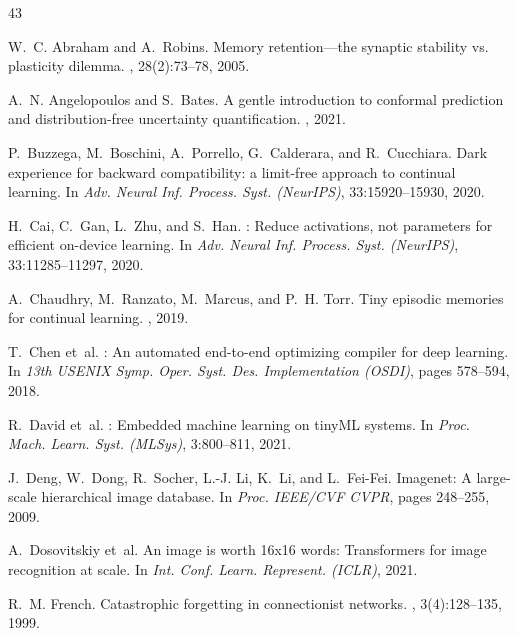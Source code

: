 \documentclass{article}
\begin{document}
\clearpage

\begin{thebibliography}{43}
\fontsize{7.2pt}{8.4pt}\selectfont
\setlength{\itemsep}{0.0pt plus 0.2pt}
\setlength{\parskip}{0pt}

W.~C. Abraham and A.~Robins.
\newblock Memory retention---the synaptic stability vs. plasticity dilemma.
, 28(2):73--78, 2005.

A.~N. Angelopoulos and S.~Bates.
\newblock A gentle introduction to conformal prediction and distribution-free uncertainty quantification.
, 2021.

P.~Buzzega, M.~Boschini, A.~Porrello, G.~Calderara, and R.~Cucchiara.
\newblock Dark experience for backward compatibility: a limit-free approach to continual learning.
\newblock In {\em Adv. Neural Inf. Process. Syst. (NeurIPS)}, 33:15920--15930, 2020.

H.~Cai, C.~Gan, L.~Zhu, and S.~Han.
: Reduce activations, not parameters for efficient on-device learning.
\newblock In {\em Adv. Neural Inf. Process. Syst. (NeurIPS)}, 33:11285--11297, 2020.

A.~Chaudhry, M.~Ranzato, M.~Marcus, and P.~H. Torr.
\newblock Tiny episodic memories for continual learning.
, 2019.

T.~Chen et~al.
: An automated end-to-end optimizing compiler for deep learning.
\newblock In {\em 13th USENIX Symp. Oper. Syst. Des. Implementation (OSDI)}, pages 578--594, 2018.

R.~David et~al.
: Embedded machine learning on tiny{ML} systems.
\newblock In {\em Proc. Mach. Learn. Syst. (MLSys)}, 3:800--811, 2021.

J.~Deng, W.~Dong, R.~Socher, L.-J. Li, K.~Li, and L.~Fei-Fei.
\newblock Imagenet: A large-scale hierarchical image database.
\newblock In {\em Proc. IEEE/CVF CVPR}, pages 248--255, 2009.

A.~Dosovitskiy et~al.
\newblock An image is worth 16x16 words: Transformers for image recognition at scale.
\newblock In {\em Int. Conf. Learn. Represent. (ICLR)}, 2021.

R.~M. French.
\newblock Catastrophic forgetting in connectionist networks.
, 3(4):128--135, 1999.


\end{thebibliography}
\end{document}
